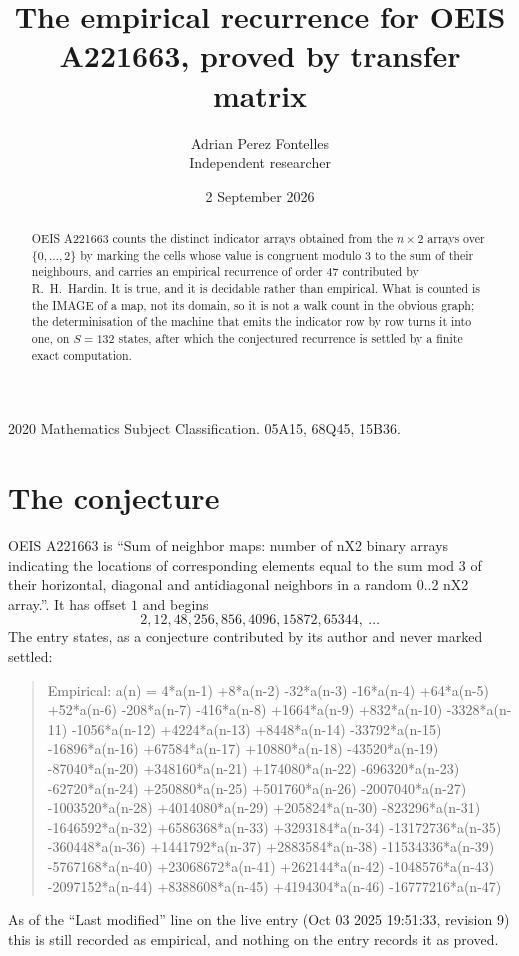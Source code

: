 \documentclass[11pt,a4paper]{article}
\title{The empirical recurrence for OEIS A221663, proved by transfer matrix}
\author{Adrian Perez Fontelles\\ \small Independent researcher}
\date{2 September 2026}
\theoremstyle{plain}
\theoremstyle{definition}
\begin{document}
\maketitle

\begin{abstract}
OEIS A221663 counts the distinct indicator arrays obtained from the $n\times2$ arrays over
$\{0,\dots,2\}$ by marking the cells whose value is congruent modulo 3 to the sum of their neighbours, and carries an
empirical recurrence of order $47$ contributed by R.~H.~Hardin. It is true, and it is
decidable rather than empirical. What is counted is the IMAGE of a map, not its domain, so it
is not a walk count in the obvious graph; the determinisation of the machine that emits the
indicator row by row turns it into one, on $S=132$ states, after which the conjectured
recurrence is settled by a finite exact computation.
\end{abstract}

\noindent\small 2020 Mathematics Subject Classification. 05A15, 68Q45, 15B36.\normalsize

\section{The conjecture}

OEIS A221663 is ``Sum of neighbor maps: number of nX2 binary arrays indicating the locations of corresponding elements equal to the sum mod 3 of their horizontal, diagonal and antidiagonal neighbors in a random 0..2 nX2 array.''. It has offset $1$ and begins
\[
2, 12, 48, 256, 856, 4096, 15872, 65344,\ \dots
\]
The entry states, as a conjecture contributed by its author and never marked settled:
\begin{quote}
Empirical: a(n) = 4*a(n-1) +8*a(n-2) -32*a(n-3) -16*a(n-4) +64*a(n-5) +52*a(n-6) -208*a(n-7) -416*a(n-8) +1664*a(n-9) +832*a(n-10) -3328*a(n-11) -1056*a(n-12) +4224*a(n-13) +8448*a(n-14) -33792*a(n-15) -16896*a(n-16) +67584*a(n-17) +10880*a(n-18) -43520*a(n-19) -87040*a(n-20) +348160*a(n-21) +174080*a(n-22) -696320*a(n-23) -62720*a(n-24) +250880*a(n-25) +501760*a(n-26) -2007040*a(n-27) -1003520*a(n-28) +4014080*a(n-29) +205824*a(n-30) -823296*a(n-31) -1646592*a(n-32) +6586368*a(n-33) +3293184*a(n-34) -13172736*a(n-35) -360448*a(n-36) +1441792*a(n-37) +2883584*a(n-38) -11534336*a(n-39) -5767168*a(n-40) +23068672*a(n-41) +262144*a(n-42) -1048576*a(n-43) -2097152*a(n-44) +8388608*a(n-45) +4194304*a(n-46) -16777216*a(n-47)
\end{quote}
As of the ``Last modified'' line on the live entry (Oct 03 2025 19:51:33, revision 9) this is still
recorded as empirical, and nothing on the entry records it as proved.
\end{document}
